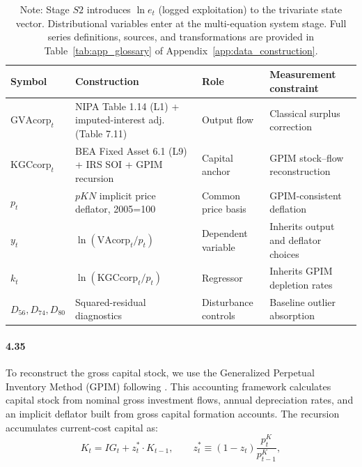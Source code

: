 \begin{table}[h!]
\centering
\caption{Core replication variables: symbols, sources, and transformations}
\label{tab:variables_replication}
\small
\begin{tabular}{@{}>{\raggedright\arraybackslash}p{2.8cm}>{\raggedright\arraybackslash}p{4.5cm}>{\raggedright\arraybackslash}p{2.2cm}>{\raggedright\arraybackslash}p{3.2cm}@{}}
\toprule
Symbol & Construction & Role & Measurement constraint \\
\midrule
$\text{GVAcorp}_t$ & NIPA Table 1.14 (L1) + imputed-interest adj. (Table 7.11) & Output flow & Classical surplus correction \\
$\text{KGCcorp}_t$ & BEA Fixed Asset 6.1 (L9) + IRS SOI + GPIM recursion & Capital anchor & GPIM stock--flow reconstruction \\
$p_t$ & $pKN$ implicit price deflator, 2005=100 & Common price basis & GPIM-consistent deflation \\
$y_t$ & $\ln(\text{VAcorp}_t/p_t)$ & Dependent variable & Inherits output and deflator choices \\
$k_t$ & $\ln(\text{KGCcorp}_t/p_t)$ & Regressor & Inherits GPIM depletion rates \\
$D_{56},D_{74},D_{80}$ & Squared-residual diagnostics  & Disturbance controls & Baseline outlier absorption \\
\bottomrule
\end{tabular}
\caption*{\footnotesize Note: Stage $S2$ introduces $\ln e_t$ (logged exploitation) to the trivariate state vector. Distributional variables enter at the multi-equation system stage. Full series definitions, sources, and transformations are provided in Table~\ref{tab:app_glossary} of Appendix~\ref{app:data_construction}.}
\end{table}

\paragraph{4.35}
To reconstruct the gross capital stock, we use the Generalized Perpetual Inventory Method (GPIM) following \citet{Shaikh2016}. This accounting framework calculates capital stock from nominal gross investment flows, annual depreciation rates, and an implicit deflator built from gross capital formation accounts. The recursion accumulates current-cost capital as:
\begin{equation}
K_t = IG_t + z_t^* \cdot K_{t-1},
\qquad
z_t^* \equiv (1 - z_t) \frac{p^K_t}{p^K_{t-1}},
\end{equation}

